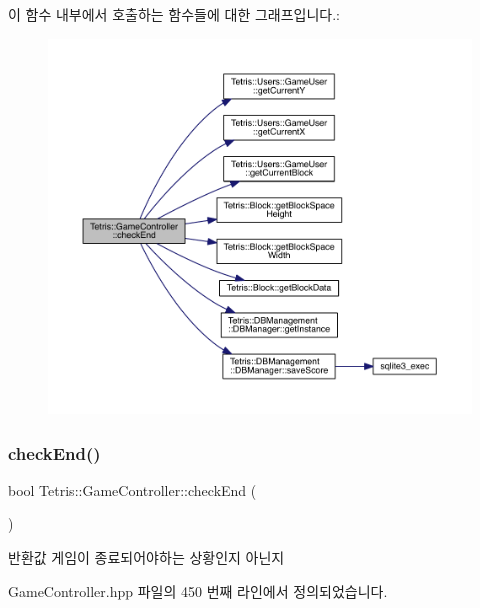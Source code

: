 이 함수 내부에서 호출하는 함수들에 대한 그래프입니다.\+:
\nopagebreak
\begin{figure}[H]
\begin{center}
\leavevmode
\includegraphics[width=350pt]{class_tetris_1_1_game_controller_ac8058c827eaa393194dcfb83c6964f8a_cgraph}
\end{center}
\end{figure}
\mbox{\label{class_tetris_1_1_game_controller_ac8058c827eaa393194dcfb83c6964f8a}} 
\subsubsection{\texorpdfstring{check\+End()}{checkEnd()}\hspace{0.1cm}{\footnotesize\ttfamily [2/2]}}
{\footnotesize\ttfamily bool Tetris\+::\+Game\+Controller\+::check\+End (\begin{DoxyParamCaption}{ }\end{DoxyParamCaption})\hspace{0.3cm}{\ttfamily [inline]}}

\begin{DoxyReturn}{반환값}
게임이 종료되어야하는 상황인지 아닌지 
\end{DoxyReturn}


Game\+Controller.\+hpp 파일의 450 번째 라인에서 정의되었습니다.

